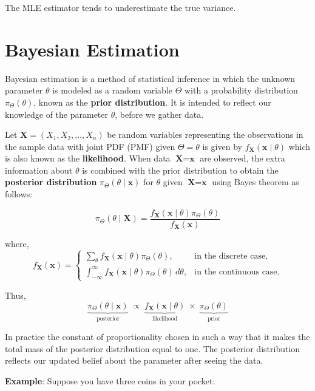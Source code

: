 \documentclass[twoside]{book}
\begin{document}
The MLE estimator tends to underestimate the true variance.


\section{Bayesian Estimation}

Bayesian estimation is a method of statistical inference in which the unknown parameter $\theta$ is modeled as a random variable $\Theta$ with a probability distribution $\pi_{\Theta}(\theta)$, known as the \textbf{prior distribution}. It is  intended to reflect our knowledge of the parameter $\theta$, before we gather data.

Let \(\mathbf{X} = (X_1, X_2, \dots, X_n)\) be random variables representing the observations in the sample data with joint PDF (PMF) given $\Theta = \theta$ is given by $f_{\textbf{X}}(\textbf{x} \mid \theta)$ which is also known as the \textbf{likelihood}. When data $ \textbf{X}=\textbf{x} $ are observed, the extra information about $ \theta $ is combined with the prior distribution to obtain the \textbf{posterior distribution} $\pi_{\Theta}(\theta \mid \textbf{x})$ for $ θ $ given $ \textbf{X}=\textbf{x} $ using Bayes theorem as follows:

\[
\pi_{\Theta}(\theta\mid\mathbf{X}) = \frac{f_{\textbf{X}}(\mathbf{x}\mid\theta) \pi_{\Theta}(\theta)}{f_{\textbf{X}}(\mathbf{x})}
\]

where,
\[
f_{\textbf{X}}(\mathbf{x}) =
\begin{cases}
\displaystyle
\sum_{\theta} f_{\textbf{X}}(\mathbf{x} \mid \theta) \pi_{\Theta}(\theta),
& \text{in the discrete case},\\[8pt]
\displaystyle
\int_{-\infty}^{\infty} f_{\textbf{X}}(\mathbf{x} \mid \theta) \pi_{\Theta}(\theta) \, d\theta,
& \text{in the continuous case}.
\end{cases}
\]

Thus,
\[
\underbrace{\pi_{\Theta}(\theta \mid \textbf{x})}_{\text{posterior}}
\;\propto\;
\underbrace{f_{\textbf{X}}(\textbf{x} \mid \theta)}_{\text{likelihood}}
\;\times\;
\underbrace{\pi_{\Theta}(\theta)}_{\text{prior}}
\]

In practice the constant of proportionality chosen in such a way that it makes the total mass of the posterior distribution equal to one. The posterior distribution reflects our updated belief about the parameter after seeing the data.

\textbf{Example}: Suppose you have three coins in your pocket:
\end{document}

